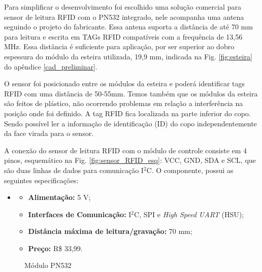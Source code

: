    Para simplificar o desenvolvimento foi escolhido uma solução comercial para sensor de leitura RFID com o PN532 integrado, nele acompanha uma antena seguindo o projeto do fabricante. Essa antena suporta a distância de até 70 mm para leitura e escrita em TAGs RFID compatíveis com a frequência de 13,56 MHz. Essa distância é suficiente para aplicação, por ser superior ao dobro espessura do módulo da esteira utilizada, 19,9 mm, indicada na Fig. \ref{fig:esteira} do apêndice \ref{cad_preliminar}.
   
   O sensor foi posicionado entre os módulos da esteira e poderá identificar tags RFID com uma distância de 50-55mm. Temos também que os módulos da esteira são feitos de plástico, não ocorrendo problemas em relação a interferência na posição onde foi definido. A tag RFID fica localizada na parte inferior do copo. Sendo possível ler a informação de identificação (ID) do copo independentemente da face virada para o sensor.
   
   A conexão do sensor de leitura RFID com o módulo de controle consiste em 4 pinos, esquemático na Fig. \ref{fig:sensor_RFID_esq}: VCC, GND, SDA e SCL, que são duas linhas de dados para comunicação I$^2$C. O componente, possui as seguintes especificações:
    
    \begin{itemize}
    \item[ ]
        \begin{itemize}
            \item \textbf{Alimentação:} 5 V;
            \item \textbf{Interfaces de Comunicação:} I$^2$C, SPI e \textit{High Speed UART} (HSU);
            \item \textbf{Distância máxima de leitura/gravação:} 70 mm;
            \item \textbf{Preço:} R\$ 33,99.
        \end{itemize}
    \end{itemize}
    
\begin{figure}[H]
    \centering
    \hspace{0.05\textwidth}
    \caption{Módulo PN532}\label{fig:modulo_RFID}
\end{figure}

